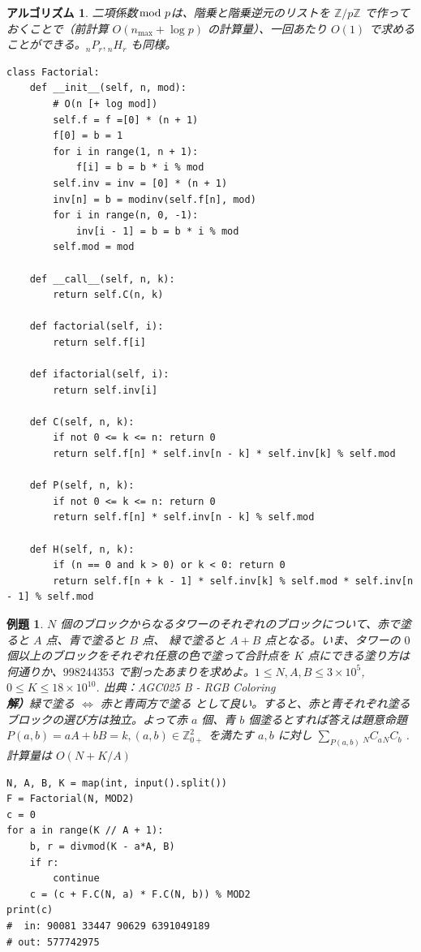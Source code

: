 \documentclass[12pt, a4j]{ltjsarticle}
\newtheorem{alg}[thm]{アルゴリズム}
\newtheorem{exm}[thm]{例題}
\newcommand*{\ZZ}{\mathbb{Z}}
\begin{document}
\vspace{1cm}

\begin{alg}
二項係数$\hspace{-2mm}\mod p$は、階乗と階乗逆元のリストを $\ZZ/p\ZZ$ で作っておくことで（前計算 $O(n_{\max} + \log p)$ の計算量）、一回あたり $O(1)$ で求めることができる。${}_nP_r, {}_nH_r$ も同様。
\\\upshape
\begin{lstlisting}
class Factorial:
    def __init__(self, n, mod):
        # O(n [+ log mod])
        self.f = f =[0] * (n + 1)
        f[0] = b = 1
        for i in range(1, n + 1):
            f[i] = b = b * i % mod
        self.inv = inv = [0] * (n + 1)
        inv[n] = b = modinv(self.f[n], mod)
        for i in range(n, 0, -1):
            inv[i - 1] = b = b * i % mod
        self.mod = mod

    def __call__(self, n, k):
        return self.C(n, k)

    def factorial(self, i):
        return self.f[i]

    def ifactorial(self, i):
        return self.inv[i]

    def C(self, n, k):
        if not 0 <= k <= n: return 0
        return self.f[n] * self.inv[n - k] * self.inv[k] % self.mod

    def P(self, n, k):
        if not 0 <= k <= n: return 0
        return self.f[n] * self.inv[n - k] % self.mod

    def H(self, n, k):
        if (n == 0 and k > 0) or k < 0: return 0
        return self.f[n + k - 1] * self.inv[k] % self.mod * self.inv[n - 1] % self.mod
\end{lstlisting}
\end{alg}

\begin{exm}
$N$ 個のブロックからなるタワーのそれぞれのブロックについて、赤で塗ると $A$ 点、青で塗ると $B$ 点、 緑で塗ると $A+B$ 点となる。いま、タワーの $0$ 個以上のブロックをそれぞれ任意の色で塗って合計点を $K$ 点にできる塗り方は何通りか、$998244353$ で割ったあまりを求めよ。$1 \le N, A, B \le 3×10^5$,  $0 \le K \le 18×10^{10}$. \hspace{\fill} 出典：\upshape AGC025 B - RGB Coloring\\
{\bf 解）}緑で塗る $\Leftrightarrow$ 赤と青両方で塗る として良い。すると、赤と青それぞれ塗るブロックの選び方は独立。よって赤 $a$ 個、青 $b$ 個塗るとすれば答えは題意命題 $P(a,b)=aA+bB=k, (a,b)\in\mathbb{Z}_{0+}^2$ を満たす $a,b$ に対し $\displaystyle\sum_{P(a,b)}{}_NC_a{}_NC_b$ .
計算量は $O(N + K/A)$\\
\begin{lstlisting}
N, A, B, K = map(int, input().split())
F = Factorial(N, MOD2)
c = 0
for a in range(K // A + 1):
    b, r = divmod(K - a*A, B)
    if r:
        continue
    c = (c + F.C(N, a) * F.C(N, b)) % MOD2
print(c)
#  in: 90081 33447 90629 6391049189
# out: 577742975
\end{lstlisting}
\end{exm}
\end{document}
